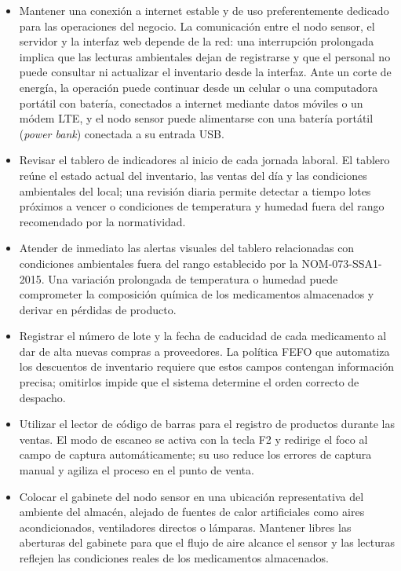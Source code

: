 \begin{itemize}

    \item Mantener una conexión a internet estable y de uso preferentemente dedicado para las operaciones del negocio. La comunicación entre el nodo sensor, el servidor y la interfaz web depende de la red: una interrupción prolongada implica que las lecturas ambientales dejan de registrarse y que el personal no puede consultar ni actualizar el inventario desde la interfaz. Ante un corte de energía, la operación puede continuar desde un celular o una computadora portátil con batería, conectados a internet mediante datos móviles o un módem LTE, y el nodo sensor puede alimentarse con una batería portátil (\textit{power bank}) conectada a su entrada USB.

    \item Revisar el tablero de indicadores al inicio de cada jornada laboral. El tablero reúne el estado actual del inventario, las ventas del día y las condiciones ambientales del local; una revisión diaria permite detectar a tiempo lotes próximos a vencer o condiciones de temperatura y humedad fuera del rango recomendado por la normatividad.

    \item Atender de inmediato las alertas visuales del tablero relacionadas con condiciones ambientales fuera del rango establecido por la NOM-073-SSA1-2015. Una variación prolongada de temperatura o humedad puede comprometer la composición química de los medicamentos almacenados y derivar en pérdidas de producto.

    \item Registrar el número de lote y la fecha de caducidad de cada medicamento al dar de alta nuevas compras a proveedores. La política FEFO que automatiza los descuentos de inventario requiere que estos campos contengan información precisa; omitirlos impide que el sistema determine el orden correcto de despacho.

    \item Utilizar el lector de código de barras para el registro de productos durante las ventas. El modo de escaneo se activa con la tecla F2 y redirige el foco al campo de captura automáticamente; su uso reduce los errores de captura manual y agiliza el proceso en el punto de venta.

    \item Colocar el gabinete del nodo sensor en una ubicación representativa del ambiente del almacén, alejado de fuentes de calor artificiales como aires acondicionados, ventiladores directos o lámparas. Mantener libres las aberturas del gabinete para que el flujo de aire alcance el sensor y las lecturas reflejen las condiciones reales de los medicamentos almacenados.


\end{itemize}
